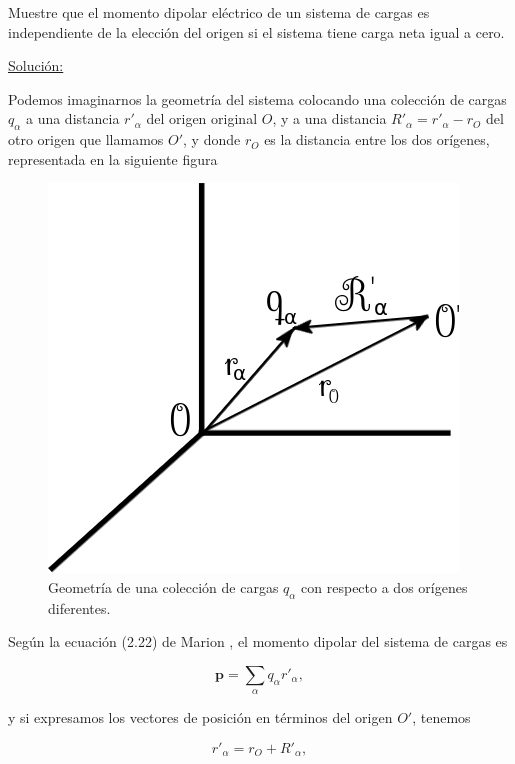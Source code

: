\documentclass[a4paper,11pt]{article}
\numberwithin{equation}{section}
\begin{document}
Muestre que el momento dipolar eléctrico de un sistema de cargas es independiente 
de la elección del origen si el sistema tiene carga neta igual a cero.

\vspace{.3cm}

\underline{Solución:} \vspace{.3cm}

Podemos imaginarnos la geometría del sistema colocando una colección de cargas 
$q_\alpha$ a una distancia $r'_\alpha$ del origen original $O$, y a una distancia 
$R'_\alpha = r'_\alpha - r_O$ del otro origen que llamamos $O'$, y donde $r_O$ es 
la distancia entre los dos orígenes, representada en la siguiente figura 

\begin{figure}[H]
 \center 
 \includegraphics[scale=0.5]{problema3fig1}
 \caption{Geometría de una colección de cargas $q_\alpha$ con respecto a dos 
 orígenes diferentes.}
 \label{fig:problema3fig1}
\end{figure}

Según la ecuación (2.22) de Marion \cite{marion2}, el momento dipolar del sistema 
de cargas es 

\begin{equation}
 \mathbf{p} = \sum_\alpha q_\alpha r'_\alpha,
\end{equation}

y si expresamos los vectores de posición en términos del origen $O'$, tenemos 

\begin{equation}
 r'_\alpha = r_O + R'_\alpha,
\end{equation}
\end{document}
